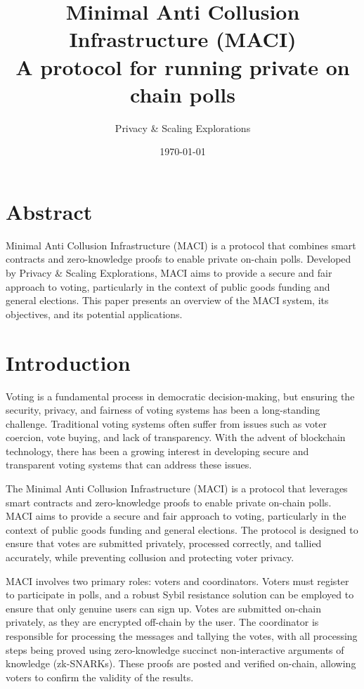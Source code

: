 \documentclass[11pt]{article}
\author{Privacy \& Scaling Explorations}
\date{\today}
\title{Minimal Anti Collusion Infrastructure (MACI)\\\medskip
\large A protocol for running private on chain polls}
\begin{document}
\maketitle
\tableofcontents

\section{Abstract}
\label{sec:orgd8af057}

Minimal Anti Collusion Infrastructure (MACI) is a protocol that combines smart contracts and zero-knowledge proofs to enable private on-chain polls. Developed by Privacy \& Scaling Explorations, MACI aims to provide a secure and fair approach to voting, particularly in the context of public goods funding and general elections. This paper presents an overview of the MACI system, its objectives, and its potential applications.
\section{Introduction}
\label{sec:orgc434a22}

Voting is a fundamental process in democratic decision-making, but ensuring the security, privacy, and fairness of voting systems has been a long-standing challenge. Traditional voting systems often suffer from issues such as voter coercion, vote buying, and lack of transparency. With the advent of blockchain technology, there has been a growing interest in developing secure and transparent voting systems that can address these issues.

The Minimal Anti Collusion Infrastructure (MACI) is a protocol that leverages smart contracts and zero-knowledge proofs to enable private on-chain polls. MACI aims to provide a secure and fair approach to voting, particularly in the context of public goods funding and general elections. The protocol is designed to ensure that votes are submitted privately, processed correctly, and tallied accurately, while preventing collusion and protecting voter privacy.

MACI involves two primary roles: voters and coordinators. Voters must register to participate in polls, and a robust Sybil resistance solution can be employed to ensure that only genuine users can sign up. Votes are submitted on-chain privately, as they are encrypted off-chain by the user. The coordinator is responsible for processing the messages and tallying the votes, with all processing steps being proved using zero-knowledge succinct non-interactive arguments of knowledge (zk-SNARKs). These proofs are posted and verified on-chain, allowing voters to confirm the validity of the results.
\end{document}
